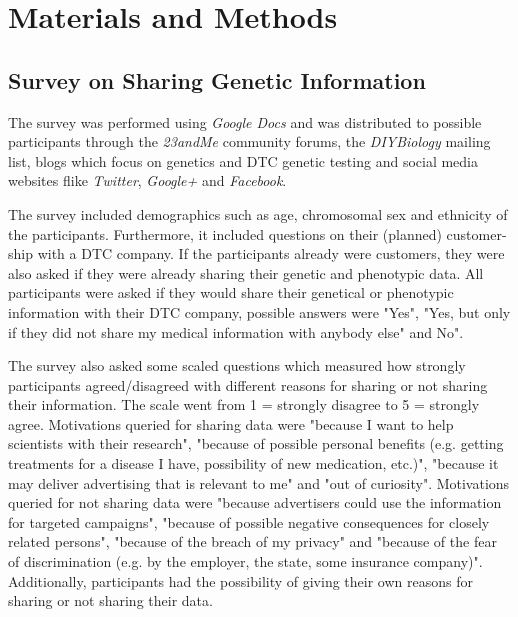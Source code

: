 \documentclass[10pt]{article}
\begin{document}
 
\section*{Materials and Methods}

\subsection*{Survey on Sharing Genetic Information}
The survey was performed using \textit{Google Docs} and was distributed to possible participants through the \textit{23andMe }community forums, the \textit{DIYBiology} mailing list, 
blogs which focus on genetics and DTC genetic testing and social media websites flike \textit{Twitter}, \textit{Google+} and \textit{Facebook}.  

The survey included demographics such as age, chromosomal sex and ethnicity of the participants. Furthermore, it included questions on their 
(planned) customer-ship with a DTC company. If the participants already were customers, they were also asked if they were already sharing their genetic and phenotypic data. 
All participants were asked if they would share their genetical or phenotypic information with their DTC company, possible answers were "Yes", "Yes, 
but only if they did not share my medical information with anybody else" and No".

The survey also asked some scaled questions which measured how strongly participants agreed/disagreed with different reasons for sharing or not sharing their 
information. The scale went from 1 = strongly disagree to  5 = strongly agree. Motivations queried for sharing data 
were "because I want to help scientists with their research", "because of possible personal benefits (e.g. getting treatments for a disease I have, 
possibility of new medication, etc.)", "because it may deliver advertising that is relevant to me" and "out of curiosity". Motivations queried for not sharing 
data were "because advertisers could use the information for targeted campaigns", "because of possible negative consequences for closely related persons", 
"because of the breach of my privacy" and "because of the fear of discrimination (e.g. by the employer, the state, some insurance company)". 
Additionally, participants had the possibility of giving their own reasons for sharing or not sharing their data.
\end{document}
